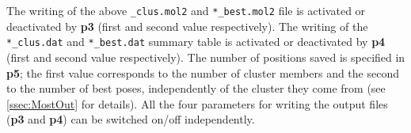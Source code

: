 \documentclass[a4paper,12pt,titlepage]{article}
\begin{document}
\noindent
The writing of the above {\tt *\_clus.mol2}  and \texttt{*\_best.mol2} file is activated or deactivated 
by {\bf p3} (first and second value respectively). The writing of the \texttt{*\_clus.dat} and \texttt{*\_best.dat} summary table is activated or deactivated by \textbf{p4} (first and second value respectively). 
The number of positions saved is specified in \textbf{p5}; the first value corresponds to the number of cluster members and the second to the number of best poses, independently of the cluster they come from (see \ref{ssec:MostOut} for details). All the four parameters for writing the output files (\textbf{p3} and \textbf{p4}) can be switched on/off independently.







\end{document}
